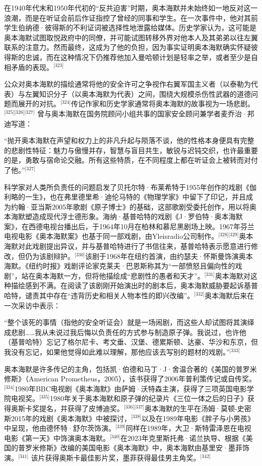 在1940年代末和1950年代初的“反共迫害”时期，奥本海默并未始终如一地反对这一浪潮，而是在听证会前后作证指控了曾经的同事和学生。在一次事件中，他对其前学生伯纳德·彼得斯的不利证词被选择性地泄露给媒体。历史学家认为，这可能是奥本海默试图取悦政府中的同僚，并可能试图转移外界对他本人及其弟弟以往左翼联系的注意力。然而最终，这成为了他的负担，因为事实证明奥本海默确实怀疑彼得斯的忠诚，而在这种情况下仍推荐他加入曼哈顿计划是轻率之举，或者至少是自相矛盾的表现。\(^\text{[323]}\)

公众对奥本海默的描绘通常将他的安全许可之争视作右翼军国主义者（以泰勒为代表）与左翼知识分子（以奥本海默为代表）之间，围绕大规模杀伤性武器的道德问题而展开的对抗。\(^\text{[324]}\)传记作家和历史学家通常将奥本海默的故事视为一场悲剧。\(^\text{[325][326][327]}\) 曾与奥本海默在国务院顾问小组共事的国家安全顾问兼学者麦乔治·邦迪写道：

“抛开奥本海默在声望和权力上的非凡升起与陨落不谈，他的性格本身便具有完整的悲剧性特征：魅力与傲慢并存，智慧与盲目共生，敏锐与迟钝交织，也许最重要的是，勇敢与宿命论交融。所有这些特质，在不同程度上都在听证会上被转而对付了他。”\(^\text{[327]}\)

科学家对人类所负责任的问题启发了贝托尔特·布莱希特于1955年创作的戏剧《伽利略的一生》，也在弗里德里希·迪伦马特的《物理学家》中留下了印记，并且成为约翰·亚当斯2005年歌剧《原子博士》的基础，这部歌剧受委托创作，用以将奥本海默塑造成现代浮士德形象。海纳·基普哈特的戏剧《J·罗伯特·奥本海默案》，在西德电视台播出后，于1964年10月在柏林和慕尼黑剧场上映。1967年芬兰电视电影《奥本海默案》也基于同一部戏剧，由Yleisradio公司制作。\(^\text{[328][329]}\)奥本海默对此戏剧提出异议，并与基普哈特进行了书信往来，基普哈特表示愿意进行修改，但仍为该剧辩护。\(^\text{[330]}\)该剧于1968年在纽约首演，由约瑟夫·怀斯曼饰演奥本海默。《纽约时报》戏剧评论家克莱夫·巴恩斯称其为“一部愤怒且偏向性的戏剧”，站在奥本海默一方，但将他描绘成“悲剧性的愚者和天才”。\(^\text{[331]}\)奥本海默对这种描绘感到不满。在阅读了该剧刚开始演出时的剧本后，奥本海默威胁要起诉基普哈特，谴责其中存在“违背历史和相关人物本性的即兴改编”。\(^\text{[332]}\)奥本海默后来在一次采访中表示：

“整个该死的事情（指他的安全听证会）就是一场闹剧，而这些人却试图将其演绎成悲剧……我从未说过我后悔以负责任的方式参与制造原子弹。我说过，也许他（基普哈特）忘记了格尔尼卡、考文垂、汉堡、德累斯顿、达豪、华沙和东京，但我没有忘记，如果他觉得如此难以理解，那他应该去写别的题材的戏剧。”\(^\text{[333]}\)

奥本海默是许多传记的主角，包括凯·伯德和马丁·J·舍温合著的《美国的普罗米修斯》（American Prometheus，2005），该书获得了2006年普利策传记或自传奖。\(^\text{[334]}\)1980年BBC电视剧《奥本海默》由萨姆·沃特森主演，获得了三项英国电影学院电视奖。\(^\text{[335]}\)1980年关于奥本海默和原子弹的纪录片《三位一体之后的日子》获得奥斯卡奖提名，并获得了皮博迪奖。\(^\text{[336][337]}\)奥本海默的生平在汤姆·莫顿-史密斯2015年的戏剧《奥本海默》中被探讨，\(^\text{[338]}\)以及在1989年电影《胖子与小男孩》中呈现，他由德怀特·舒尔茨饰演。\(^\text{[339]}\)同样在1989年，大卫·斯特雷泽恩在电视电影《第一天》中饰演奥本海默。\(^\text{[340]}\)在2023年克里斯托弗·诺兰执导、根据《美国的普罗米修斯》改编的美国电影《奥本海默》中，奥本海默由基里安·墨菲饰演。\(^\text{[341]}\) 该片获得奥斯卡最佳影片奖，墨菲获得最佳男主角奖。\(^\text{[342]}\)

